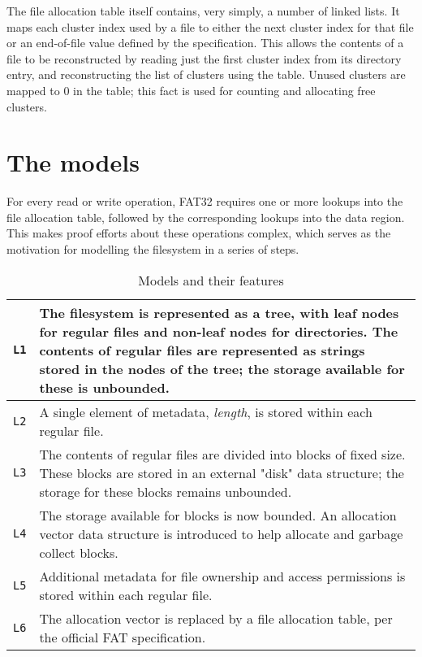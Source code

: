 \documentclass[runningheads,a4paper]{llncs}
\begin{document}
The file allocation table itself contains, very simply, a number of
linked lists. It maps each cluster index used by a file to either the
next cluster index for that file or an end-of-file value defined by the
specification. This allows the contents of a file to be reconstructed
by reading just the first cluster index from its directory entry, and
reconstructing the list of clusters using the table. Unused clusters
are mapped to 0 in the table; this fact is used for counting and
allocating free clusters.

\section{The models}

For every read or write operation, FAT32 requires one or more lookups
into the file allocation table, followed by the corresponding lookups
into the data region. This makes proof efforts about these operations
complex, which serves as the motivation for modelling the filesystem
in a series of steps.

\begin{table}[]
  \centering
  \caption{Models and their features}
  \label{model-description-table}
  \begin{tabular}{|l|p{120mm}|}
    \hline
    \texttt{L1} & The filesystem is represented as a tree, with leaf
    nodes for regular files and non-leaf nodes for
    directories. The contents of regular files are represented as
    strings stored in the nodes of the tree; the storage available for
    these is unbounded. \\ \hline
    \texttt{L2} & A single element of metadata, \textit{length}, is
    stored within each regular file.  \\ \hline
    \texttt{L3} & The contents of regular files are divided into
    blocks of fixed size. These blocks are stored in an external
    "disk" data structure; the storage for these blocks remains
    unbounded. \\ \hline
    \texttt{L4} & The storage available for blocks is now bounded. An
    allocation vector data structure is introduced to help allocate
    and garbage collect blocks. \\ \hline
    \texttt{L5} & Additional metadata for file ownership and access
    permissions is stored within each regular file. \\ \hline
    \texttt{L6} & The allocation vector is replaced by a file
    allocation table, per the official FAT specification. \\ \hline
  \end{tabular}
\end{table}
\end{document}
